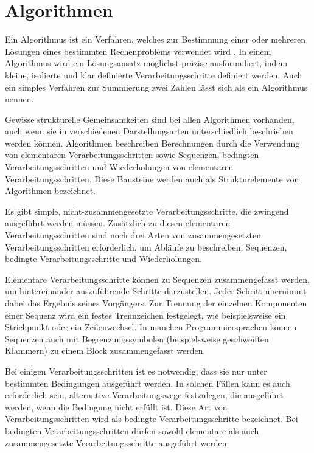 \section{Algorithmen}
Ein Algorithmus ist ein Verfahren, welches zur Bestimmung einer oder mehreren Lösungen eines bestimmten Rechenproblems verwendet wird \autocite[1]{knebl_algorithmen_2021}. In einem Algorithmus wird ein Lösungsansatz möglichst präzise ausformuliert, indem kleine, isolierte und klar definierte Verarbeitungsschritte definiert werden. Auch ein simples Verfahren zur Summierung zwei Zahlen lässt sich als ein Algorithmus nennen. \autocite[9-10]{hubwieser_fundamente_2015}

Gewisse strukturelle Gemeinsamkeiten sind bei allen Algorithmen vorhanden, auch wenn sie in verschiedenen Darstellungsarten unterschiedlich beschrieben werden können. Algorithmen beschreiben Berechnungen durch die Verwendung von elementaren Verarbeitungsschritten sowie Sequenzen, bedingten Verarbeitungsschritten und Wiederholungen von elementaren Verarbeitungsschritten. Diese Bausteine werden auch als Strukturelemente von Algorithmen bezeichnet. \autocite[12]{hubwieser_fundamente_2015}

Es gibt simple, nicht-zusammengesetzte  Verarbeitungsschritte, die zwingend ausgeführt werden müssen. Zusätzlich zu diesen elementaren Verarbeitungsschritten sind noch drei Arten von zusammengesetzten Verarbeitungsschritten erforderlich, um Abläufe zu beschreiben: Sequenzen, bedingte Verarbeitungsschritte und Wiederholungen. \autocite[12]{hubwieser_fundamente_2015}

Elementare Verarbeitungsschritte können zu Sequenzen zusammengefasst werden, um hintereinander auszuführende Schritte darzustellen. Jeder Schritt übernimmt dabei das Ergebnis seines Vorgängers. Zur Trennung der einzelnen Komponenten einer Sequenz wird ein festes Trennzeichen festgelegt, wie beispielsweise ein Strichpunkt oder ein Zeilenwechsel. In manchen Programmiersprachen können Sequenzen auch mit Begrenzungssymbolen (beispielsweise geschweiften Klammern) zu einem Block zusammengefasst werden.\autocite[12]{hubwieser_fundamente_2015}

Bei einigen Verarbeitungsschritten ist es notwendig, dass sie nur unter bestimmten Bedingungen ausgeführt werden. In solchen Fällen kann es auch erforderlich sein, alternative Verarbeitungswege festzulegen, die ausgeführt werden, wenn die Bedingung nicht erfüllt ist. Diese Art von Verarbeitungsschritten wird als bedingte Verarbeitungsschritte bezeichnet. Bei bedingten Verarbeitungsschritten dürfen sowohl elementare als auch zusammengesetzte Verarbeitungsschritte ausgeführt werden. \autocite[12-13]{hubwieser_fundamente_2015}

